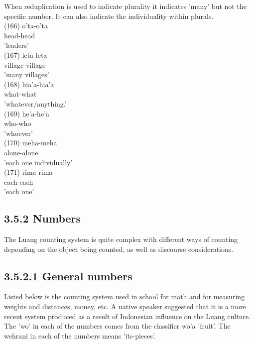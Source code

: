 \documentclass[10pt]{article}
\begin{document}
When reduplication is used to indicate plurality it indicates 'many' but not the specific number. It can also indicate the individuality within plurals.\\
(166) o'ta-o'ta\\
head-head\\
'leaders'\\
(167) leta-leta\\
village-village\\
'many villages'\\
(168) hia'a-hia'a\\
what-what\\
'whatever/anything.'\\
(169) he'a-he'a\\
who-who\\
'whoever'\\
(170) meha-meha\\
alone-alone\\
'each one individually'\\
(171) rima-rima\\
each-each\\
'each one'

\subsection*{3.5.2 Numbers}
The Luang counting system is quite complex with different ways of counting depending on the object being counted, as well as discourse considerations.

\subsection*{3.5.2.1 General numbers}
Listed below is the counting system used in school for math and for measuring weights and distances, money, etc. A native speaker suggested that it is a more recent system produced as a result of Indonesian influence on the Luang culture. The 'wo' in each of the numbers comes from the classifier wo'a 'fruit'. The wehrani in each of the numbers means 'its-pieces'.
\end{document}
